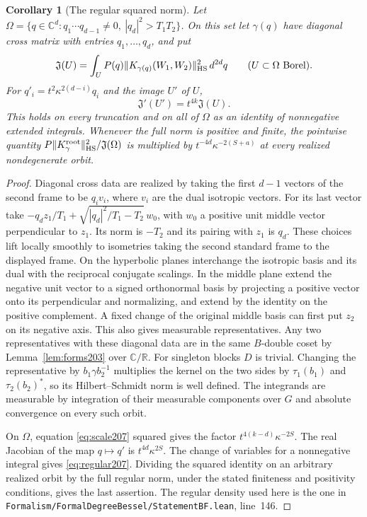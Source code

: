 \documentclass[a4paper,11pt]{article}
\newtheorem{corollary}[proposition]{Corollary}
\theoremstyle{definition}
\theoremstyle{remark}
\newcommand{\RR}{\mathbb R}\newcommand{\CC}{\mathbb C}\newcommand{\QQ}{\mathbb Q}
\newcommand{\srcloc}[2]{{\small\nolinkurl{#1.lean}}, line~#2}
\numberwithin{equation}{section}
\begin{document}
\begin{corollary}[The regular squared norm]\label{cor:regular207}
Let \(\Omega=\{q\in\CC^d:q_1\cdots q_{d-1}\ne0,\
|q_d|^2>T_1T_2\}\). On this set let \(\gamma(q)\) have diagonal
cross matrix with entries \(q_1,\ldots,q_d\), and put
\[
  \mathfrak J(U)=\int_U P(q)
      \|K_{\gamma(q)}(W_1,W_2)\|_{\rm HS}^2\,d^{2d}q
               \qquad(U\subset\Omega\ \text{Borel}).
\]
For \(q'_i=t^2\kappa^{2(d-i)}q_i\) and the image \(U'\) of \(U\),
\begin{equation}
                   \mathfrak J'(U')=t^{4k}\mathfrak J(U).
                                                       \label{eq:regular207}
\end{equation}
This holds on every truncation and on all of \(\Omega\) as an
identity of nonnegative extended integrals. Whenever the full
norm is positive and finite, the pointwise quantity
\(P\|K_\gamma^{\rm root}\|_{\rm HS}^2/\mathfrak J(\Omega)\)
is multiplied by \(t^{-4d}\kappa^{-2(S+a)}\) at every realized
nondegenerate orbit.
\end{corollary}
\begin{proof}
Diagonal cross data are realized by taking the first \(d-1\)
vectors of the second frame to be \(q_iv_i\), where \(v_i\)
are the dual isotropic vectors. For its last vector take
\(-q_d z_1/T_1+\sqrt{|q_d|^2/T_1-T_2}\,w_0\), with \(w_0\)
a positive unit middle vector perpendicular to \(z_1\). Its norm
is \(-T_2\) and its pairing with \(z_1\) is \(q_d\).
These choices lift locally smoothly to isometries taking the
second standard frame to the displayed frame. On the hyperbolic
planes interchange the isotropic basis and its dual with the
reciprocal conjugate scalings. In the middle plane extend the
negative unit vector to a signed orthonormal basis by projecting
a positive vector onto its perpendicular and normalizing, and
extend by the identity on the positive complement. A fixed change
of the original middle basis can first put \(z_2\) on its
negative axis. This also gives measurable representatives.
Any two representatives with these diagonal data are in the
same \(B\)-double coset by Lemma~\ref{lem:forms203} over \(\CC/\RR\).
For singleton blocks \(D\) is trivial. Changing the representative
by \(b_1\gamma b_2^{-1}\) multiplies the kernel on the two sides
by \(\tau_1(b_1)\) and \(\tau_2(b_2)^*\), so its Hilbert--Schmidt
norm is well defined. The integrands are measurable by integration
of their measurable components over \(G\) and absolute convergence
on every such orbit.

On \(\Omega\), equation \eqref{eq:scale207} squared gives the
factor \(t^{4(k-d)}\kappa^{-2S}\). The real Jacobian of the map
\(q\mapsto q'\) is \(t^{4d}\kappa^{2S}\).
The change of variables for a nonnegative integral gives
\eqref{eq:regular207}. Dividing the squared identity on an arbitrary
realized orbit by the full regular norm, under the stated finiteness
and positivity conditions, gives the last assertion. The regular
density used here is the one in
\srcloc{Formalism/FormalDegreeBessel/StatementBF}{146}.
\end{proof}
\end{document}

